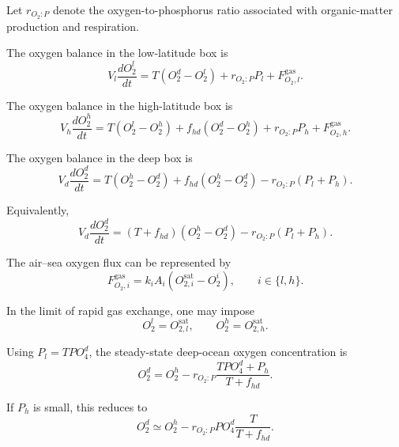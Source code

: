 \documentclass[11pt]{article}
\begin{document}
Let \(r_{O_2:P}\) denote the oxygen-to-phosphorus ratio
associated with organic-matter production and respiration.

The oxygen balance in the low-latitude box is
\begin{equation}
V_l\frac{dO_2^l}{dt}
=
T\left(O_2^d-O_2^l\right)
+
r_{O_2:P}P_l
+
F^{\mathrm{gas}}_{O_2,l}.
\label{eq:o2_l}
\end{equation}

The oxygen balance in the high-latitude box is
\begin{equation}
V_h\frac{dO_2^h}{dt}
=
T\left(O_2^l-O_2^h\right)
+
f_{hd}\left(O_2^d-O_2^h\right)
+
r_{O_2:P}P_h
+
F^{\mathrm{gas}}_{O_2,h}.
\label{eq:o2_h}
\end{equation}

The oxygen balance in the deep box is
\begin{equation}
V_d\frac{dO_2^d}{dt}
=
T\left(O_2^h-O_2^d\right)
+
f_{hd}\left(O_2^h-O_2^d\right)
-
r_{O_2:P}\left(P_l+P_h\right).
\label{eq:o2_d}
\end{equation}

Equivalently,
\begin{equation}
V_d\frac{dO_2^d}{dt}
=
\left(T+f_{hd}\right)
\left(O_2^h-O_2^d\right)
-
r_{O_2:P}\left(P_l+P_h\right).
\label{eq:o2_d_paper}
\end{equation}

The air--sea oxygen flux can be represented by
\begin{equation}
F^{\mathrm{gas}}_{O_2,i}
=
k_iA_i
\left(
O_{2,i}^{\mathrm{sat}}-O_2^i
\right),
\qquad
i\in\{l,h\}.
\label{eq:o2_gas_flux}
\end{equation}

In the limit of rapid gas exchange, one may impose
\begin{equation}
O_2^l=O_{2,l}^{\mathrm{sat}},
\qquad
O_2^h=O_{2,h}^{\mathrm{sat}}.
\label{eq:o2_saturation}
\end{equation}

Using \(P_l=TPO_4^d\), the steady-state deep-ocean oxygen
concentration is
\begin{equation}
O_2^d
=
O_2^h
-
r_{O_2:P}
\frac{
TPO_4^d+P_h
}{
T+f_{hd}
}.
\label{eq:o2_d_steady}
\end{equation}

If \(P_h\) is small, this reduces to
\begin{equation}
O_2^d
\simeq
O_2^h
-
r_{O_2:P}PO_4^d
\frac{T}{T+f_{hd}}.
\label{eq:o2_d_steady_weak_Ph}
\end{equation}
\end{document}

